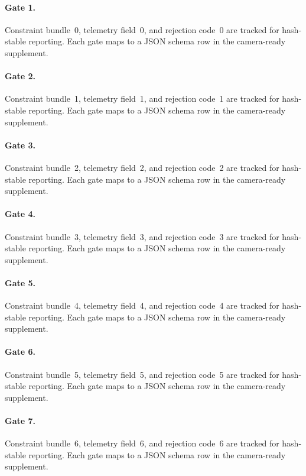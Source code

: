 \documentclass[sigconf,nonacm]{acmart}
\begin{document}
\paragraph{Gate 1.}
Constraint bundle~0, telemetry field~0, and rejection code~0 are tracked for hash-stable reporting. Each gate maps to a JSON schema row in the camera-ready supplement. %

\paragraph{Gate 2.}
Constraint bundle~1, telemetry field~1, and rejection code~1 are tracked for hash-stable reporting. Each gate maps to a JSON schema row in the camera-ready supplement. %

\paragraph{Gate 3.}
Constraint bundle~2, telemetry field~2, and rejection code~2 are tracked for hash-stable reporting. Each gate maps to a JSON schema row in the camera-ready supplement. %

\paragraph{Gate 4.}
Constraint bundle~3, telemetry field~3, and rejection code~3 are tracked for hash-stable reporting. Each gate maps to a JSON schema row in the camera-ready supplement. %

\paragraph{Gate 5.}
Constraint bundle~4, telemetry field~4, and rejection code~4 are tracked for hash-stable reporting. Each gate maps to a JSON schema row in the camera-ready supplement. %

\paragraph{Gate 6.}
Constraint bundle~5, telemetry field~5, and rejection code~5 are tracked for hash-stable reporting. Each gate maps to a JSON schema row in the camera-ready supplement. %

\paragraph{Gate 7.}
Constraint bundle~6, telemetry field~6, and rejection code~6 are tracked for hash-stable reporting. Each gate maps to a JSON schema row in the camera-ready supplement. %
\end{document}

